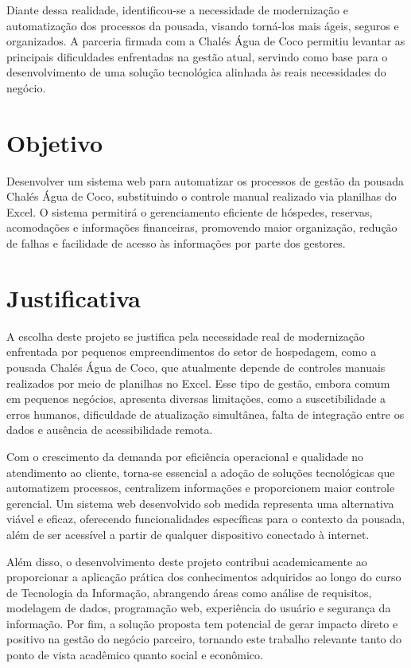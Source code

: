 \documentclass[
	12pt,				%
	openany,			%
	twoside,			%
	a4paper,			%
	english,			%
	french,				%
	spanish,			%
	brazil				%
	]{abntex2}
\begin{document}
Diante dessa realidade, identificou-se a necessidade de modernização e automatização dos processos da pousada, visando torná-los mais ágeis, seguros e organizados. A parceria firmada com a Chalés Água de Coco permitiu levantar as principais dificuldades enfrentadas na gestão atual, servindo como base para o desenvolvimento de uma solução tecnológica alinhada às reais necessidades do negócio.

\section{Objetivo}
Desenvolver um sistema web para automatizar os processos de gestão da pousada Chalés Água de Coco, substituindo o controle manual realizado via planilhas do Excel. O sistema permitirá o gerenciamento eficiente de hóspedes, reservas, acomodações e informações financeiras, promovendo maior organização, redução de falhas e facilidade de acesso às informações por parte dos gestores.

\section{Justificativa}
A escolha deste projeto se justifica pela necessidade real de modernização enfrentada por pequenos empreendimentos do setor de hospedagem, como a pousada Chalés Água de Coco, que atualmente depende de controles manuais realizados por meio de planilhas no Excel. Esse tipo de gestão, embora comum em pequenos negócios, apresenta diversas limitações, como a suscetibilidade a erros humanos, dificuldade de atualização simultânea, falta de integração entre os dados e ausência de acessibilidade remota.

Com o crescimento da demanda por eficiência operacional e qualidade no atendimento ao cliente, torna-se essencial a adoção de soluções tecnológicas que automatizem processos, centralizem informações e proporcionem maior controle gerencial. Um sistema web desenvolvido sob medida representa uma alternativa viável e eficaz, oferecendo funcionalidades específicas para o contexto da pousada, além de ser acessível a partir de qualquer dispositivo conectado à internet.

Além disso, o desenvolvimento deste projeto contribui academicamente ao proporcionar a aplicação prática dos conhecimentos adquiridos ao longo do curso de Tecnologia da Informação, abrangendo áreas como análise de requisitos, modelagem de dados, programação web, experiência do usuário e segurança da informação. Por fim, a solução proposta tem potencial de gerar impacto direto e positivo na gestão do negócio parceiro, tornando este trabalho relevante tanto do ponto de vista acadêmico quanto social e econômico.
\end{document}
